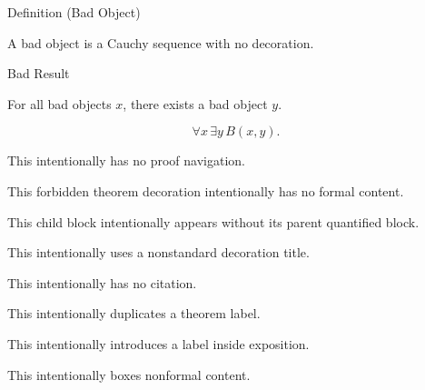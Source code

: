 \begin{definitionbox}{Definition (Bad Object)}
\begin{definition}
\label{thm:bad-object}
A bad object is a Cauchy sequence with no decoration.
\end{definition}
\end{definitionbox}

\begin{theorembox}{Bad Result}
\begin{theorem}
\label{thm:bad-result}
For all bad objects $x$, there exists a bad object $y$.
\end{theorem}
\end{theorembox}
\begin{remark*}
\[
  \forall x\, \exists y\, B(x,y).
\]
\end{remark*}
\begin{remark*}[Interpretation]
This intentionally has no proof navigation.
\end{remark*}
\begin{remark*}[Examples]
This forbidden theorem decoration intentionally has no formal content.
\end{remark*}
\begin{remark*}
This child block intentionally appears without its parent quantified block.
\end{remark*}
\begin{remark*}
This intentionally uses a nonstandard decoration title.
\end{remark*}
\begin{remark*}
This intentionally has no citation.
\end{remark*}
\begin{remark*}
\label{thm:bad-result}
This intentionally duplicates a theorem label.
\end{remark*}
\begin{remark*}[Exposition]
This intentionally introduces \label{bad:hidden-claim} a label inside exposition.
\end{remark*}
\begin{tcolorbox}
\begin{remark*}[Boxed]
This intentionally boxes nonformal content.
\end{remark*}
\end{tcolorbox}
\NoLocalDependencies
